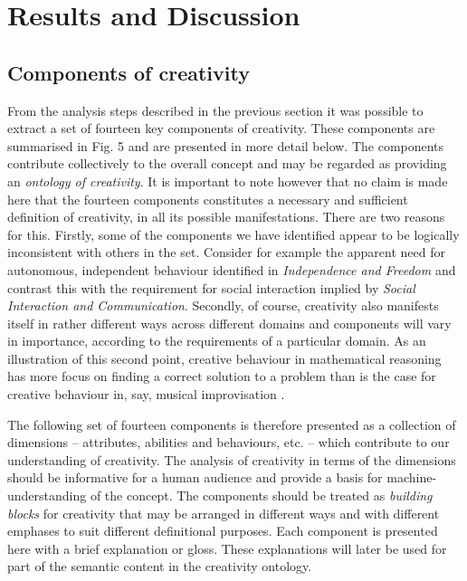 \documentclass[10pt,letterpaper]{article}
\begin{document}
\section*{Results and Discussion}
\label{results}

\subsection*{Components of creativity}\label{componentsResults}


From the analysis steps described in the previous section it was possible to extract a set of fourteen key components of creativity. These components are summarised in Fig. 5 %
and are presented in more detail below. The components contribute collectively to the overall concept and may be regarded as providing an {\em ontology of creativity\/}.  It is important to note however that no claim is made here that the fourteen components constitutes a necessary and sufficient definition of creativity, in all its possible manifestations. There are two reasons for this. Firstly, 
some of the components we have identified appear to be logically inconsistent with others in the set. Consider for example the apparent need for autonomous, independent behaviour identified in {\em Independence and Freedom\/} and contrast this with the requirement for social interaction implied by {\em Social Interaction and Communication\/}. %
Secondly, of course, creativity %
also manifests itself in rather different ways across different domains \cite{plucker04} and components will vary in importance, according to the requirements of a particular domain. As an illustration of this second point, %
creative behaviour in mathematical reasoning has more focus on finding a correct solution to a problem than is the case for creative behaviour in, say,  musical improvisation \cite{colton08,jordanous12jims}. 

The following set of fourteen components is therefore presented as a collection of dimensions -- attributes, abilities and behaviours, etc. -- which contribute to our understanding of creativity. The analysis of creativity in terms of the dimensions should be informative for a human audience and provide a basis for machine-understanding of the concept. 
The components should be treated as {\em building blocks} for creativity that may be arranged in different ways and with different emphases to suit different definitional purposes. Each component is presented here with a brief explanation or gloss. These explanations will later be used for part of the semantic content in the creativity ontology.
\end{document}
